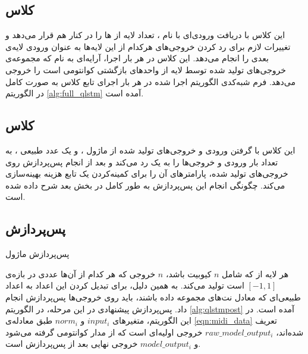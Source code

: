 \subsection{
کلاس
}

این کلاس با دریافت ورودی‌ای با نام
،
تعداد
لایه از 
ها را در کنار هم قرار می‌دهد و تغییرات لازم برای رد کردن خروجی‌های هرکدام از این لایه‌ها به عنوان ورودی لایه‌ی بعدی را انجام می‌دهد. این کلاس در هر بار اجرا، آرایه‌ای به نام
که مجموعه‌ی خروجی‌های تولید شده توسط 
لایه از واحدهای بازگشتی کوانتومی است را خروجی می‌دهد.
فرم شبه‌کدی الگوریتم اجرا شده در هر بار اجرای تابع
کلاس 
به صورت کامل در الگوریتم
\ref{alg:full_qlstm}
آمده است.

\subsection{
کلاس
}
این کلاس با گرفتن ورودی و خروجی‌های تولید شده از ماژول
،
و یک عدد طبیعی
،
به تعداد
بار
ورودی و خروجی‌ها را به یک 
رد می‌کند و بعد از انجام پس‌پردازش روی خروجی‌های تولید شده، پارامترهای آن را برای کمینه‌کردن یک تابع هزینه بهینه‌سازی می‌کند. چگونگی انجام این پس‌پردازش به طور کامل در بخش بعد شرح داده شده است.

\subsection{پس‌پردازش} \label{sec:qlstm_post}
\begin{algorithm}[t]
\caption{پس‌پردازش ماژول }  \label{alg:qlstmpost}
\end{algorithm}
هر لایه از
که شامل
$n$
کیوبیت باشد، 
$n$
خروجی که هر کدام از آن‌ها عددی در بازه‌ی
$[-1, 1]$
است تولید می‌کند. به همین دلیل، برای تبدیل کردن این اعداد به اعداد طبیعی‌ای که معادل نت‌های مجموعه داده باشند، باید روی خروجی‌ها پس‌پردازش انجام داد.
پس‌پردازش پیشنهادی در این مرحله، در الگوریتم
\ref{alg:qlstmpost}
آمده است. در این الگوریتم، متغیرهای
$input_i$
و
$norm_i$
طبق معادله‌ی
\ref{eqn:midi_data}
تعریف شده‌اند،
$raw\_model\_output_i$
خروجی اولیه‌ای است که از مدار کوانتومی گرفته می‌شود و
$model\_output_i$
خروجی نهایی بعد از پس‌پردازش است.



